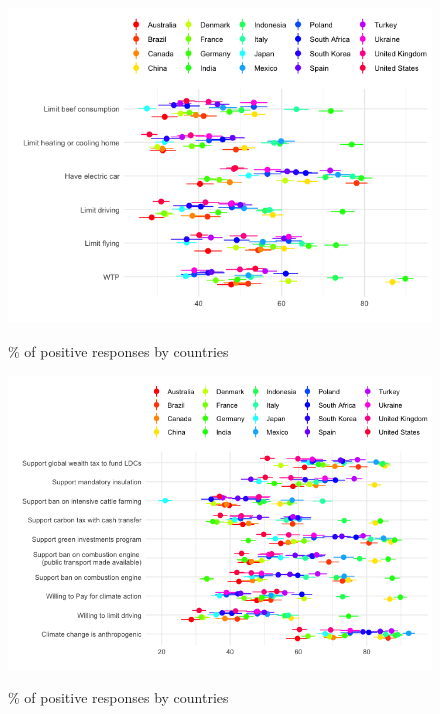 \begin{frame}{}%
\begin{figure}[h!]
\caption{\% of positive responses by countries} %
\includegraphics[width=.7\paperwidth]{../figures/country_comparison/willingness_by_country.png} \\
\end{figure}
\end{frame}


\begin{frame}{}%
\begin{figure}[h!]
\caption{\% of positive responses by countries} %
\includegraphics[width=.7\paperwidth]{../figures/country_comparison/main_var_by_country.png} \\
\end{figure}
\end{frame}

